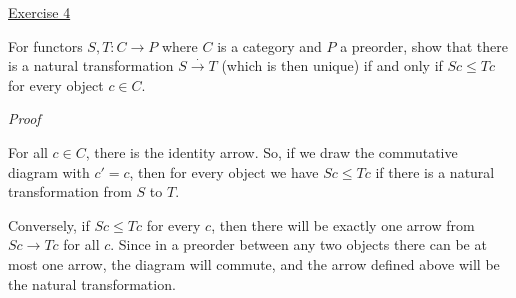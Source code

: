 \noindent
\underline{Exercise 4}
\vspace{2mm}

For functors $S, T: C \to P$ where $C$ is a category and $P$ a preorder, show that
there is a natural transformation $S \xrightarrow{.} T$ (which is then unique) if and only if
$Sc \leq Tc$ for every object $c \in C$.

\vspace{2mm}

\noindent
\emph{Proof}

For all $c \in C$, there is the identity arrow. So, if we draw the commutative diagram with $c' = c$, then for every object we have $Sc \leq Tc$ if there is a natural transformation from $S$ to $T$.

Conversely, if $Sc \leq Tc$ for every $c$, then there will be exactly one arrow from $Sc \to Tc$ for all $c$. Since in a preorder between any two objects there can be at most one arrow, the diagram will commute, and the arrow defined above will be the natural transformation.

\vspace{2mm}
